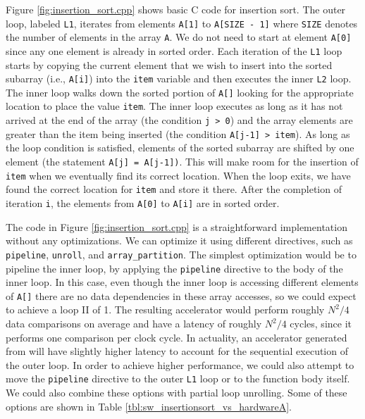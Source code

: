 Figure \ref{fig:insertion_sort.cpp} shows basic C code for insertion sort. The outer loop, labeled \lstinline{L1}, iterates from elements \lstinline{A[1]} to \lstinline{A[SIZE - 1]} where \lstinline{SIZE} denotes the number of elements in the array \lstinline{A}. We do not need to start at element \lstinline{A[0]} since any one element is already in sorted order. Each iteration of the \lstinline{L1} loop starts by copying the current element that we wish to insert into the sorted subarray (i.e., \lstinline{A[i]}) into the \lstinline{item} variable and then executes the inner \lstinline{L2} loop. The inner loop walks down the sorted portion of \lstinline{A[]} looking for the appropriate location to place the value \lstinline{item}. The inner loop executes as long as it has not arrived at the end of the array (the condition \lstinline{j > 0}) and the array elements are greater than the item being inserted (the condition \lstinline{A[j-1] > item}). As long as the loop condition is satisfied, elements of the sorted subarray are shifted by one element (the statement \lstinline{A[j] = A[j-1])}. This will make room for the insertion of \lstinline{item} when we eventually find its correct location. When the loop exits, we have found the correct location for \lstinline{item} and store it there. After the completion of iteration \lstinline{i}, the elements from \lstinline{A[0]} to \lstinline{A[i]} are in sorted order.

The code in Figure \ref{fig:insertion_sort.cpp} is a straightforward implementation without any optimizations. We can optimize it using different \VHLS directives, such as \lstinline{pipeline}, \lstinline{unroll}, and \lstinline{array_partition}. The simplest optimization would be to pipeline the inner loop, by applying the \lstinline{pipeline} directive to the body of the inner loop.  In this case, even though the inner loop is accessing different elements of \lstinline{A[]} there are no data dependencies in these array accesses, so we could expect to achieve a loop II of 1. The resulting accelerator would perform roughly $N^2/4$ data comparisons\cite{sedgewickalgorithmsinC} on average and have a latency of roughly $N^2/4$ cycles, since it performs one comparison per clock cycle.  In actuality, an accelerator generated from \VHLS will have slightly higher latency to account for the sequential execution of the outer loop.   In order to achieve higher performance, we could also attempt to move the \lstinline{pipeline} directive to the outer \lstinline{L1} loop or to the function body itself.  We could also combine these options with partial loop unrolling.  Some of these options are shown in Table \ref{tbl:sw_insertionsort_vs_hardwareA}.

